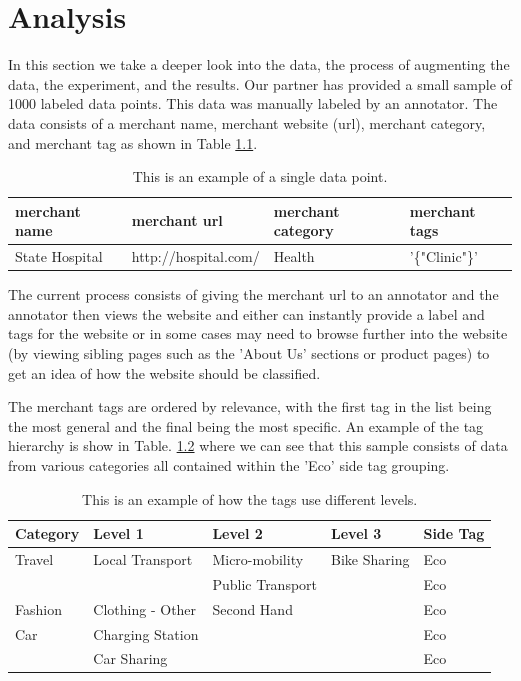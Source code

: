 \chapter{Analysis}

In this section we take a deeper look into the data, the process of augmenting the data, the experiment, and the results. Our partner has provided a small sample of 1000 labeled data points. This data was manually labeled by an annotator. The data consists of a merchant name, merchant website (url), merchant category, and merchant tag as shown in Table \ref{tab:data_point}. 


\begin{table}[h]
\begin{tabular}{|l|l|l|l|}
\hline
merchant name            & merchant url            & merchant category & merchant tags           \\ \hline
State Hospital & http://hospital.com/ & Health   & '\{"Clinic"\}' \\ \hline
\end{tabular}
\caption{This is an example of a single data point.}
\label{tab:data_point}
\end{table}


The current process consists of giving the merchant url to an annotator and the annotator then views the website and either can instantly  provide a label and tags for the website or in some cases may need to browse further into the website (by viewing sibling pages such as the 'About Us' sections or product pages) to get an idea of how the website should be classified. 

The merchant tags are ordered by relevance, with the first tag in the list being the most general and the final being the most specific. An example of the tag hierarchy is show in Table. \ref{tab:tags} where we can see that this sample consists of data from various categories all contained within the 'Eco' side tag grouping.


\begin{table}[h]
\begin{tabular}{|l|l|l|l|l|}
\hline
Category       & Level 1                     & Level 2                       & Level 3      & Side Tag \\ \hline
Travel         & Local Transport             & Micro-mobility                & Bike Sharing & Eco      \\ \hline
               &                             & Public Transport              &              & Eco      \\ \hline
Fashion        & Clothing - Other            & Second Hand                   &              & Eco      \\ \hline
Car            & Charging Station            &                               &              & Eco      \\ \hline
               & Car Sharing                 &                               &              & Eco      \\ \hline
\end{tabular}
\caption{This is an example of how the tags use different levels.}
\label{tab:tags}
\end{table}


